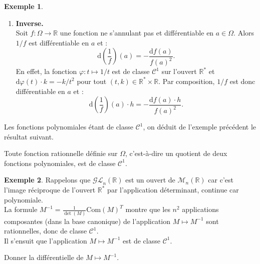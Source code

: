 \documentclass[french]{article}
\newcommand{\R}{\mathbb{R}}
\newcommand{\st}{^*}
\newcommand{\inv}{^{-1}}
\renewcommand{\d}{\text{d}}
\theoremstyle{plain}
\theoremstyle{definition}
\newtheorem*{ex}{Exemple}
\theoremstyle{remark}
\begin{document}
\begin{ex}
\begin{enumerate}
		Soit $\mathcal{B}'=(e_1',\ldots,e_n')$ une base de $F$ et $f:\Omega\to F$. \\
		La fonction $f$ est différentiable en $a\in\Omega$ si, et seulement si, toutes ses applications composantes $f_1,\ldots,f_n$ dans $\mathcal{B}'$ sont différentiables en $a$ et l'on a alors :
		$$\forall i\in\llbracket1,n\rrbracket,\ \d f(a)_i=\d f_i(a).$$
		On en déduit que la fonction $f$ est différentiable (respectivement de classe $\mathcal{C}^1$) si, et seulement si, toutes les applications composantes sont différentiables (respectivement de classe $\mathcal{C}^1$).
		\item \textbf{Inverse.}\\
		Soit $f:\Omega\to\R$ une fonction ne s'annulant pas et différentiable en $a\in\Omega$. Alors $1/f$ est différentiable en $a$ et :
		$$\d\left(\frac{1}{f}\right)(a)=-\frac{\d f(a)}{f(a)^2}.$$
		En effet, la fonction $\varphi:t\mapsto 1/t$ est de classe $\mathcal{C}^1$ sur l'ouvert $\R\st$ et $\d\varphi(t)\cdot k=-k/t^2$ pour tout $(t,k)\in\R\st\times\R$. Par composition, $1/f$ est donc différentiable en $a$ et :
		$$\d\left(\frac{1}{f}\right)(a)\cdot h=-\frac{\d f(a)\cdot h}{f(a)^2}.$$
	\end{enumerate}
\end{ex}

Les fonctions polynomiales étant de classe $\mathcal{C}^1$, on déduit de l'exemple précédent le résultat suivant.

\begin{prop}%
	Toute fonction rationnelle définie sur $\Omega$, c'est-à-dire un quotient de deux fonctions polynomiales, est de classe $\mathcal{C}^1$.
\end{prop}

\begin{ex}
	Rappelons que $\mathcal{GL}_n(\R)$ est un ouvert de $\mathcal{M}_n(\R)$ car c'est l'image réciproque de l'ouvert $\R\st$ par l'application déterminant, continue car polynomiale.\\
	La formule $M\inv=\displaystyle\frac{1}{\det(M)}\text{Com}(M)^T$ montre que les $n^2$ applications composantes (dans la base canonique) de l'application $M\mapsto M\inv$ sont rationnelles, donc de classe $\mathcal{C}^1$. \\
	Il s'ensuit que l'application $M\mapsto M\inv$ est de classe $\mathcal{C}^1$.
\end{ex}

\begin{exo}
	Donner la différentielle de $M\mapsto M\inv$.
\end{exo}
\end{document}
